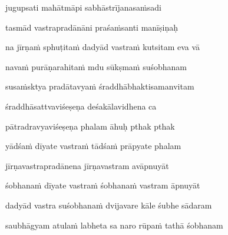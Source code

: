 jugupsati mahātmāpi sabhāstrījanasaṁsadi \veg\dontdisplaylinenum
{}

tasmād vastrapradānāni praśaṁsanti manīṣiṇaḥ\thinspace{\dandab} \dontdisplaylinenum

na jīrṇaṁ sphuṭitaṁ dadyād vastraṁ kutsitam eva vā \veg\dontdisplaylinenum
{}

navaṁ purāṇarahitaṁ mdu sūkṣmaṁ suśobhanam\thinspace{\dandab} \dontdisplaylinenum

susaṁsktya pradātavyaṁ śraddhābhaktisamanvitam \veg\dontdisplaylinenum
{}

śraddhāsattvaviśeṣeṇa deśakālavidhena ca\thinspace{\dandab} \dontdisplaylinenum

pātradravyaviśeṣeṇa phalam āhuḥ pthak pthak \veg\dontdisplaylinenum

yādśaṁ dīyate vastraṁ tādśaṁ prāpyate phalam\thinspace{\dandab} \dontdisplaylinenum

jīrṇavastrapradānena jīrṇavastram avāpnuyāt \danda\dontdisplaylinenum

śobhanaṁ dīyate vastraṁ śobhanaṁ vastram āpnuyāt \veg\dontdisplaylinenum

\ujvers\nemsloka 
dadyād vastra suśobhanaṁ dvijavare kāle śubhe sādaram
\dontdisplaylinenum

\nemslokab 
saubhāgyam atulaṁ labheta sa naro rūpaṁ tathā śobhanam \danda\dontdisplaylinenum


